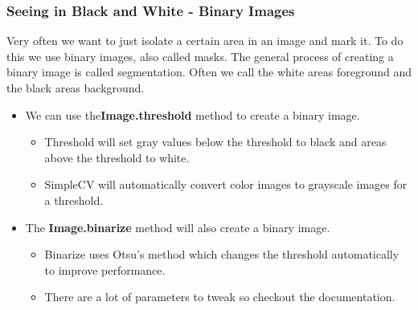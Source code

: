\documentclass[compress]{beamer}
\begin{document}
\begin{frame}
\frametitle{Seeing in Black and White - Binary Images}
\small{Very often we want to just isolate a certain area in an image and mark
it. To do this we use binary images, also called masks. The general
process of creating a binary image is called segmentation. Often we call
the white areas foreground and the black areas background. }
\begin{itemize}
\item We can use the\textbf{Image.threshold} method to create a binary
  image. 
  \begin{itemize}
  \item Threshold will set gray values below the threshold to black
    and areas above the threshold to white.
  \item SimpleCV will automatically convert color images to grayscale
    images for a threshold.
  \end{itemize}
\item The \textbf{Image.binarize} method will also create a binary
  image.
   \begin{itemize}
   \item Binarize uses Otsu's method which changes the threshold
     automatically to improve performance. 
   \item There are a lot of parameters to tweak so checkout the
     documentation.
  \end{itemize}
\end{itemize}
\end{frame}
\end{document}
